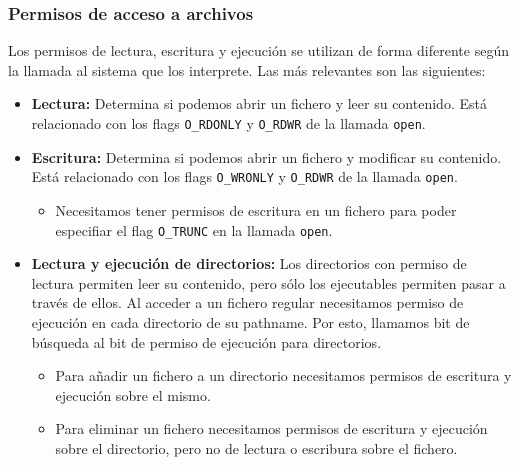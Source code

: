 \subsubsection{Permisos de acceso a archivos}

Los permisos de lectura, escritura y ejecución se utilizan de forma diferente según la llamada al sistema que los interprete.
Las más relevantes son las siguientes:

\begin{itemize}
	\item\textbf{Lectura:} Determina si podemos abrir un fichero y leer su contenido. Está relacionado con los flags \texttt{O\_RDONLY} y \texttt{O\_RDWR} de la llamada \texttt{open}.
	\item\textbf{Escritura:} Determina si podemos abrir un fichero y modificar su contenido. Está relacionado con los flags \texttt{O\_WRONLY} y \texttt{O\_RDWR} de la llamada \texttt{open}.
	\begin{itemize}
		\item Necesitamos tener permisos de escritura en un fichero para poder especifiar el flag \texttt{O\_TRUNC} en la llamada \texttt{open}.
	\end{itemize}
	\item\textbf{Lectura y ejecución de directorios:} Los directorios con permiso de lectura permiten leer su contenido, pero sólo los ejecutables permiten pasar a través de ellos. Al acceder a un fichero regular necesitamos permiso de ejecución en cada directorio de su pathname. Por esto, llamamos bit de búsqueda al bit de permiso de ejecución para directorios.
	\begin{itemize}
		\item Para añadir un fichero a un directorio necesitamos permisos de escritura y ejecución sobre el mismo.
		\item Para eliminar un fichero necesitamos permisos de escritura y ejecución sobre el directorio, pero no de lectura o escribura sobre el fichero.
	\end{itemize}
\end{itemize}


